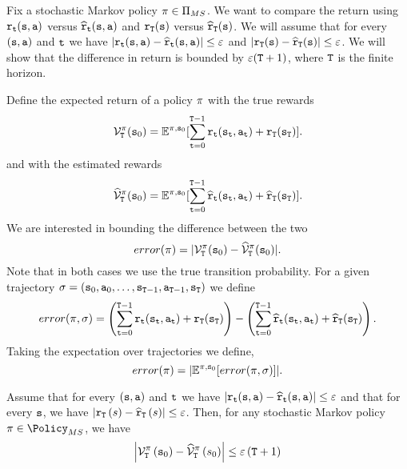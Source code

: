Fix a stochastic Markov policy $\pi\in  {\Pi _{MS}}$. We want
to compare the return using ${\tt r}_{\tt t}({\tt s},{\tt a})$ versus
$\widehat{{\tt r}}_{\tt t}({\tt s},{\tt a})$ and ${\tt r}_{\tt T}({\tt s})$
versus $\widehat{{\tt r}}_{\tt T}({\tt s})$. We will assume that
for every $({\tt s},{\tt a})$ and ${\tt t}$ we have
$|{\tt r}_{\tt t}({\tt s},{\tt a})-\widehat{{\tt r}}_{\tt t}({\tt s},{\tt a})|\leq
\varepsilon$ and
$|{\tt r}_{\tt T}({\tt s})-\widehat{{\tt r}}_{\tt T}({\tt s})|\leq
\varepsilon$. We will show that the difference in return is bounded
by $\varepsilon({\tt T}+1)$, where ${\tt T}$ is the finite
horizon.

Define the expected return of a policy $\pi$ with the true rewards
\[
\mathcal{V}^\pi_{\tt T}({\tt s}_0)=\mathbb{E}^{\pi,{\tt s}_0}[\sum_{{\tt t}=0}^{{\tt T}-1}
{\tt r}_{\tt t}({\tt s}_{\tt t},{\tt a}_{\tt t})+{\tt r}_{\tt T}({\tt s}_{\tt T})].
\]
and with the estimated rewards
\[
\widehat{\mathcal{V}}^\pi_{\tt T}({\tt s}_0)=\mathbb{E}^{\pi,{\tt s}_0}[\sum_{{\tt t}=0}^{{\tt T}-1}
\widehat{{\tt r}}_{\tt t}({\tt s}_{\tt t},{\tt a}_{\tt t})+\widehat{{\tt r}}_{\tt T}({\tt s}_{\tt T})].
\]
We are interested in bounding the difference between the two
\[
error(\pi)=|\mathcal{V}^\pi_{\tt T}({\tt s}_0)-\widehat{\mathcal{V}}^\pi_{\tt T}({\tt s}_0)|.
\]
Note that in both cases we use the true transition probability. For
a given trajectory $\sigma=({\tt s}_0,{\tt a}_0,\ldots,
{\tt s}_{{\tt T}-1},{\tt a}_{{\tt T}-1},{\tt s}_{\tt T})$ we
define
\[
error(\pi,\sigma)= \left(\sum_{{\tt t}=0}^{{\tt T}-1}
{\tt r}_{\tt t}({\tt s}_{\tt t},{\tt a}_{\tt t})+{\tt r}_{\tt T}({\tt s}_{\tt T})\right)-
\left(\sum_{{\tt t}=0}^{{\tt T}-1}
\widehat{{\tt r}}_{\tt t}({\tt s}_{\tt t},{\tt a}_{\tt t})+\widehat{{\tt r}}_{\tt T}({\tt s}_{\tt T})\right).
\]
Taking the expectation over trajectories we define,
\[
error(\pi)=|\mathbb{E}^{\pi,{\tt s}_0} [error(\pi,\sigma)]|.
\]

\begin{lemma}
\label{lemma:approx-FH-error}
%
Assume that for every $({\tt s},{\tt a})$ and ${\tt t}$ we have
$|{\tt r}_{\tt t}({\tt s},{\tt a})-\widehat{{\tt r}}_{\tt t}({\tt s},{\tt a})|\leq
\varepsilon$ and that for every ${\tt s}$, we have $\left|{\tt r}_{{\tt T}}\left(s\right)-\widehat{{\tt r}}_{{\tt T}}\left(s\right)\right|\leq\varepsilon$.
Then, for any stochastic Markov policy $\policy\in\Policy_{MS}$, we have 
\[
\left|\mathcal{V}_{{\tt T}}^{\pi}\left({\tt s}_{0}\right)-\widehat{\mathcal{V}}_{{\tt T}}^{\pi}\left(s_{0}\right)\right|\leq\varepsilon\left({\tt T}+1\right)
\]
\end{lemma}

